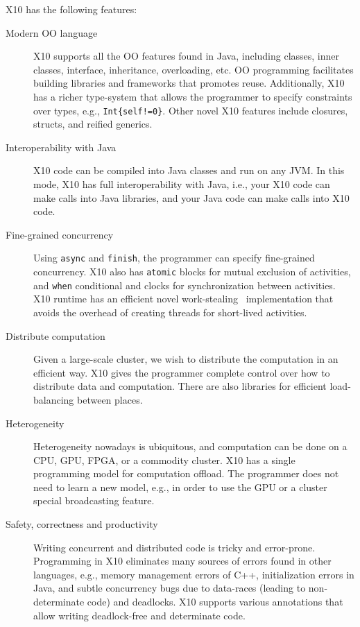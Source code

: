 \documentclass[a4paper]{article}
\def\codesmaller{\small}
\newcommand{\code}[1]{\texttt{\textup{\codesmaller #1}}}
\begin{document}
X10 has the following features:
\begin{description}
  \item[Modern OO language]
    X10 supports all the OO features found in Java,
        including classes, inner classes, interface, inheritance, overloading, etc.
    OO programming facilitates building libraries and frameworks that promotes reuse.
    Additionally, X10 has a richer type-system that allows the programmer
        to specify constraints over types, e.g., \code{Int\{self!=0\}}.
    Other novel X10 features include closures, structs, and reified generics.
  \item[Interoperability with Java]
    X10 code can be compiled into Java classes and run on any JVM.
    In this mode, X10 has full interoperability with Java,
        i.e., your X10 code can make calls into Java libraries,
        and your Java code can make calls into X10 code.
  \item[Fine-grained concurrency]
    Using \code{async} and \code{finish}, the programmer can specify
        fine-grained concurrency.
    X10 also has \code{atomic} blocks for mutual exclusion of activities,
        and \code{when} conditional and clocks for synchronization between activities.
    X10 runtime has an efficient novel work-stealing~\cite{} implementation
        that avoids the overhead of creating threads for short-lived activities.
  \item[Distribute computation]
    Given a large-scale cluster, we wish to distribute the computation in an efficient way.
    X10 gives the programmer complete control over how to distribute data and computation.
    There are also libraries for efficient load-balancing between places.
  \item[Heterogeneity]
    Heterogeneity nowadays is ubiquitous, and computation can be done on a CPU, GPU, FPGA, or a commodity cluster.
    X10 has a single programming model for computation offload.
    The programmer does not need to learn a new model, e.g., in order to use the GPU or
        a cluster special broadcasting feature.
  \item[Safety, correctness and productivity]
    Writing concurrent and distributed code is tricky and error-prone.
    Programming in X10 eliminates many sources of errors found in other languages,
        e.g., memory management errors of C++, initialization errors in Java,
        and subtle concurrency bugs due to data-races (leading to non-determinate code)
        and deadlocks.
    X10 supports various annotations that allow writing deadlock-free and determinate code.
\end{description}
\end{document}
